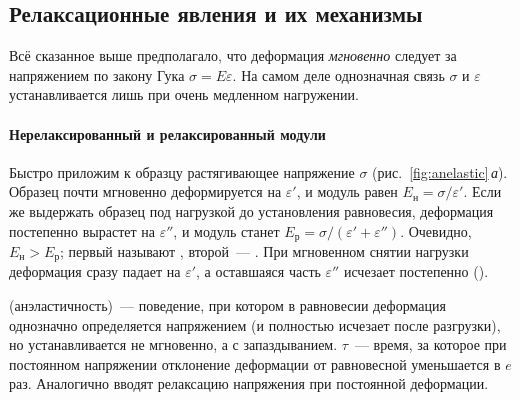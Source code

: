 \subsection{Релаксационные явления и их механизмы}\label{ssec:relaxation}

Всё сказанное выше предполагало, что деформация \emph{мгновенно}
следует за напряжением по закону Гука $\sigma=E\varepsilon$. На самом деле
однозначная связь $\sigma$ и $\varepsilon$ устанавливается лишь при очень
медленном нагружении.

\paragraph{Нерелаксированный и релаксированный модули}
Быстро приложим к образцу растягивающее напряжение $\sigma$
(рис.~\ref{fig:anelastic}\,\textit{а}). Образец почти мгновенно
деформируется на $\varepsilon'$, и модуль равен
$E_\text{н}=\sigma/\varepsilon'$. Если же выдержать образец под нагрузкой до
установления равновесия, деформация постепенно вырастет на $\varepsilon''$, и
модуль станет $E_\text{р}=\sigma/(\varepsilon'+\varepsilon'')$. Очевидно,
$E_\text{н}>E_\text{р}$; первый называют , второй~—
. При мгновенном снятии нагрузки деформация сразу
падает на $\varepsilon'$, а оставшаяся часть $\varepsilon''$ исчезает
постепенно ().

\begin{opredelenie}
 (анэластичность)~— поведение, при котором в
равновесии деформация однозначно определяется напряжением (и полностью
исчезает после разгрузки), но устанавливается не мгновенно, а с
запаздыванием.  $\tau$~— время, за
которое при постоянном напряжении отклонение деформации от равновесной
уменьшается в $e$ раз. Аналогично вводят релаксацию напряжения при
постоянной деформации.
\end{opredelenie}

